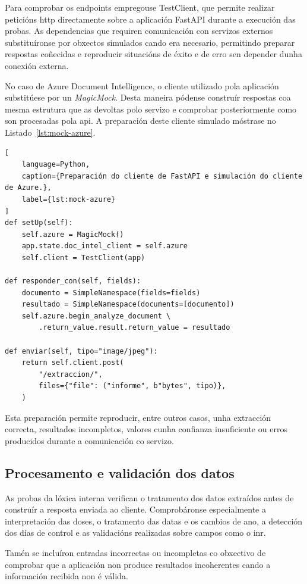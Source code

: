 Para comprobar os endpoints empregouse TestClient, que permite realizar peticións \gls{http} directamente sobre a aplicación FastAPI durante a execución das probas. As dependencias que requiren comunicación con servizos externos substituíronse por obxectos simulados cando era necesario, permitindo preparar respostas coñecidas e reproducir situacións de éxito e de erro sen depender dunha conexión externa.

No caso de Azure Document Intelligence, o cliente utilizado pola aplicación substitúese por un \textit{MagicMock}. Desta maneira pódense construír respostas coa mesma estrutura que as devoltas polo servizo e comprobar posteriormente como son procesadas pola \gls{api}. A preparación deste cliente simulado móstrase no Listado~\ref{lst:mock-azure}.

\begin{lstlisting}[
    language=Python,
    caption={Preparación do cliente de FastAPI e simulación do cliente de Azure.},
    label={lst:mock-azure}
]
def setUp(self):
    self.azure = MagicMock()
    app.state.doc_intel_client = self.azure
    self.client = TestClient(app)

def responder_con(self, fields):
    documento = SimpleNamespace(fields=fields)
    resultado = SimpleNamespace(documents=[documento])
    self.azure.begin_analyze_document \
        .return_value.result.return_value = resultado

def enviar(self, tipo="image/jpeg"):
    return self.client.post(
        "/extraccion/",
        files={"file": ("informe", b"bytes", tipo)},
    )
\end{lstlisting}

Esta preparación permite reproducir, entre outros casos, unha extracción correcta, resultados incompletos, valores cunha confianza insuficiente ou erros producidos durante a comunicación co servizo.


\subsection{Procesamento e validación dos datos}

As probas da lóxica interna verifican o tratamento dos datos extraídos antes de construír a resposta enviada ao cliente. Comprobáronse especialmente a interpretación das doses, o tratamento das datas e os cambios de ano, a detección dos días de control e as validacións realizadas sobre campos como o \gls{inr}.

Tamén se incluíron entradas incorrectas ou incompletas co obxectivo de comprobar que a aplicación non produce resultados incoherentes cando a información recibida non é válida.

